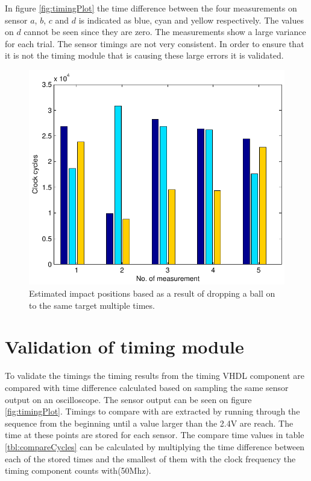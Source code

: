 In figure \ref{fig:timingPlot} the time difference between the four measurements on sensor $a$, $b$, $c$ and $d$ is indicated as blue, cyan and yellow respectively.
The values on $d$ cannot be seen since they are zero.
The measurements show a large variance for each trial. The sensor timings are not very consistent. In order to ensure that it is not the timing module that is causing these large errors it is validated.
%
\begin{figure}[htb]
	\centering
	\includegraphics[width=.8\textwidth]{figures/clockCycles30deg.pdf}
	\caption{Estimated impact positions based as a result of dropping a ball on to the same target multiple times.}
	\label{fig:clockCycles30deg}
\end{figure}
%
\section{Validation of timing module}
To validate the timings the timing results from the timing VHDL component are compared with time difference calculated based on sampling the same sensor output on an oscilloscope. The sensor output can be seen on figure \ref{fig:timingPlot}. Timings to compare with are extracted by running through the sequence from the beginning until a value larger than the 2.4V are reach. The time at these points are stored for each sensor. The compare time values in table \ref{tbl:compareCycles} can be calculated by multiplying the time difference between each of the stored times and the smallest of them with the clock frequency the timing component counts with(50Mhz).

